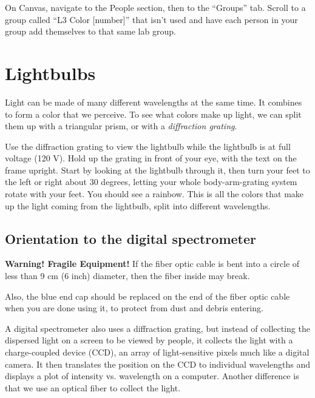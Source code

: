 \begin{steps}
	\item On Canvas, navigate to the People section, then to the ``Groups'' tab. Scroll to a group called ``L3 Color [number]'' that isn't used and have each person in your group add themselves to that same lab group.
\end{steps}

\section{Lightbulbs}

Light can be made of many different wavelengths at the same time. It combines to form a color that we perceive. To see what colors make up light, we can split them up with a triangular prism, or with a \textit{diffraction grating}.

\begin{steps}
	\item Use the diffraction grating to view the lightbulb while the lightbulb is at full voltage (120 V). Hold up the grating in front of your eye, with the text on the frame upright. Start by looking at the lightbulb through it, then turn your feet to the left or right about 30 degrees, letting your whole body-arm-grating system rotate with your feet. You should see a rainbow. This is all the colors that make up the light coming from the lightbulb, split into different wavelengths.
\end{steps}

\subsection{Orientation to the digital spectrometer}

\begin{framed}
	\textbf{Warning! Fragile Equipment!} If the fiber optic cable is bent into a circle of less than 9 cm (6 inch) diameter, then the fiber inside may break.
	
	Also, the blue end cap should be replaced on the end of the fiber optic cable when you are done using it, to protect from dust and debris entering.
\end{framed}

A digital spectrometer also uses a diffraction grating, but instead of collecting the dispersed light on a screen to be viewed by people, it collects the light with a charge-coupled device (CCD), an array of light-sensitive pixels much like a digital camera. It then translates the position on the CCD to individual wavelengths and displays a plot of intensity vs. wavelength on a computer. %
Another difference is that we use an optical fiber to collect the light.

